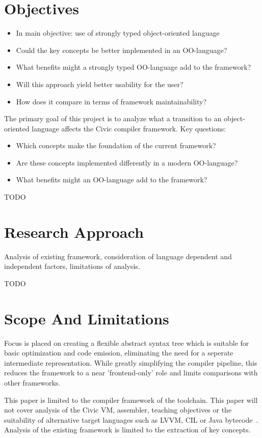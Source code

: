 \documentclass[twoside,openright]{uva-bachelor-thesis}
\begin{document}
	\section{Objectives}
		\begin{itemize}
			\item In main objective: use of strongly typed object-oriented language
			\item Could the key concepts be better implemented in an OO-language?
			\item What benefits might a strongly typed OO-language add to the framework?
			\item Will this approach yield better usability for the user?
			\item How does it compare in terms of framework maintainability?
		\end{itemize}
				
		The primary goal of this project is to analyze what a transition to an object-oriented language affects the Civic compiler framework. Key questions:
		\begin{itemize}
			\item Which concepts make the foundation of the current framework?
			\item Are these concepts implemented differently in a modern OO-language?
			\item What benefits might an OO-language add to the framework?
		\end{itemize}
		
		TODO
	
	\section{Research Approach}
		Analysis of existing framework, consideration of language dependent and independent factors, limitations of analysis.
		
		TODO
	
	\section{Scope And Limitations}
		 Focus is placed on creating a flexible abstract syntax tree which is suitable for basic optimization and code emission, eliminating the need for a seperate intermediate representation. While greatly simplifying the compiler pipeline, this reduces the framework to a near 'frontend-only' role and limits comparisons with other frameworks.
		
		This paper is limited to the compiler framework of the toolchain. This paper will not cover analysis of the Civic VM, assembler, teaching objectives or the suitability of alternative target languages such as LVVM, CIL or Java bytecode~\cite{lattner2002llvm,website:sac}. Analysis of the existing framework is limited to the extraction of key concepts.
\end{document}
